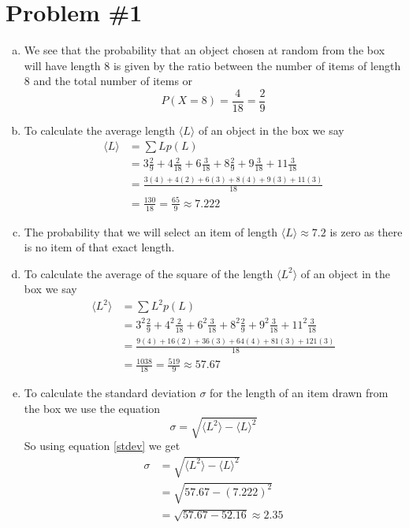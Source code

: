 \documentclass[11pt]{article}
\numberwithin{equation}{section}
\begin{document}


\section{Problem \#1}
\begin{enumerate}[(a)]
\item
We see that the probability that an object chosen at random from the box will have length 8 is given by the ratio between the number of items of length 8 and the total number of items or
$$P(X=8) = \frac{4}{18} = \frac{2}{9}$$

\item
To calculate the average length $\langle L\rangle$ of an object in the box we say
\begin{align*}
\langle L\rangle &= \sum Lp(L)\\
&= 3\frac{2}{9}+4\frac{2}{18}+6\frac{3}{18} + 8\frac{2}{9}+9\frac{3}{18}+11\frac{3}{18}\\
&= \frac{3(4)+4(2)+6(3)+8(4)+9(3)+11(3)}{18}\\
&= \frac{130}{18} = \frac{65}{9} \approx 7.222
\end{align*}

\item
The probability that we will select an item of length $\langle L\rangle \approx 7.2$ is zero as there is no item of that exact length.

\item
To calculate the average of the square of the length $\langle L^2\rangle$ of an object in the box we say
\begin{align*}
\langle L^2\rangle &= \sum L^2p(L)\\
&= 3^2\frac{2}{9}+4^2\frac{2}{18}+6^2\frac{3}{18} + 8^2\frac{2}{9}+9^2\frac{3}{18}+11^2\frac{3}{18}\\
&= \frac{9(4)+16(2)+36(3)+64(4)+81(3)+121(3)}{18}\\
&= \frac{1038}{18} = \frac{519}{9} \approx 57.67
\end{align*}

\item
To calculate the standard deviation $\sigma$ for the length of an item drawn from the box we use the equation 
\begin{equation}
\sigma = \sqrt{\langle L^2\rangle - \langle L\rangle^2}
\label{stdev}
\end{equation}
So using equation \ref{stdev} we get
\begin{align*}
\sigma &= \sqrt{\langle L^2\rangle - \langle L\rangle^2}\\
&= \sqrt{57.67 - (7.222)^2}\\
&= \sqrt{57.67 - 52.16} \approx 2.35
\end{align*}


\end{enumerate}
\end{document}
